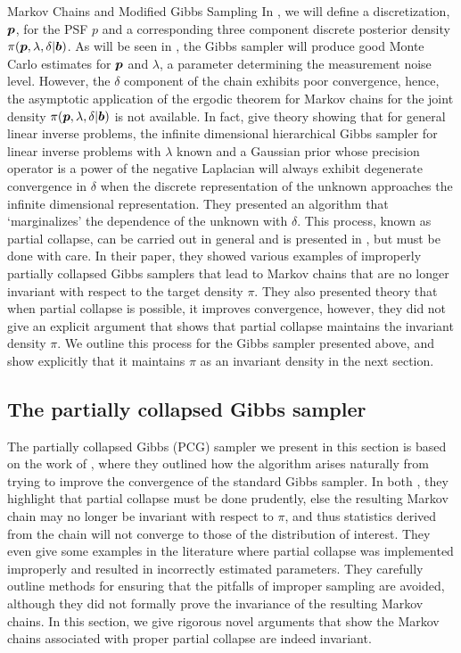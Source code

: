 \begin{chapter}{Markov Chains and Modified Gibbs Sampling}
In , we will define a discretization, $\mbox{\boldmath$p$}$, for the PSF $p$ and a corresponding three component discrete posterior density $\pi(\mbox{\boldmath$p$},\lambda,\delta|\mbox{\boldmath$b$})$.
As will be seen in , the Gibbs sampler will produce good Monte Carlo estimates for $\mbox{\boldmath$p$}$ and  $\lambda$, a parameter determining the measurement noise level. 
However, the $\delta$ component of the chain exhibits poor convergence, hence, the asymptotic application of the ergodic theorem for Markov chains for the joint density $\pi(\mbox{\boldmath$p$},\lambda,\delta|\mbox{\boldmath$b$})$ is not available.
In fact, \citep{agapiou2014analysis} give theory showing that for general linear inverse problems, the infinite dimensional hierarchical Gibbs sampler for linear inverse problems with $\lambda$ known and a Gaussian prior whose precision operator is a power of the negative Laplacian will always exhibit degenerate convergence in $\delta$ when the discrete representation of the unknown approaches the infinite dimensional representation.
They presented an algorithm that `marginalizes' the dependence of the unknown with $\delta$.
This process, known as partial collapse, can be carried out in general and is presented in \citep{van2008partially}, but must be done with care.
In their paper, they showed various examples of improperly partially collapsed Gibbs samplers that lead to Markov chains that are no longer invariant with respect to the target density $\pi$.
They also presented theory that when partial collapse is possible, it improves convergence, however, they did not give an explicit argument that shows that partial collapse maintains the invariant density $\pi$.
We outline this process for the Gibbs sampler presented above, and show explicitly that it maintains $\pi$ as an invariant density in the next section.

\subsection{The partially collapsed Gibbs sampler}
The partially collapsed Gibbs (PCG) sampler we present in this section is based on the work of \citep{van2008partially,van2015metropolis}, where they outlined how the algorithm arises naturally from trying to improve the convergence of the standard Gibbs sampler.
In both \citep{van2008partially,van2015metropolis}, they highlight that partial collapse must be done prudently, else the resulting Markov chain may no longer be invariant with respect to $\pi$, and thus statistics derived from the chain will not converge to those of the distribution of interest.
They even give some examples in the literature where partial collapse was implemented improperly and resulted in incorrectly estimated parameters.
They carefully outline methods for ensuring that the pitfalls of improper sampling are avoided, although they did not formally prove the invariance of the resulting Markov chains.
In this section, we give rigorous novel arguments that show the Markov chains associated with proper partial collapse are indeed invariant.


\end{chapter}
